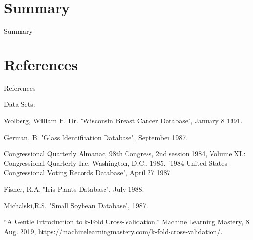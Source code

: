 \documentclass{article}
\begin{document}
\section{Summary}

Summary

\section{References}

References

Data Sets:

Wolberg, William H. Dr. "Wisconsin Breast Cancer Database", January 8 1991.

German, B. "Glass Identification Database", September 1987.

Congressional Quarterly Almanac, 98th Congress, 2nd session 1984, Volume XL: Congressional Quarterly Inc. Washington, D.C., 1985. "1984 United States Congressional Voting Records Database", April 27 1987.

Fisher, R.A. "Iris Plants Database", July 1988.

Michalski,R.S. "Small Soybean Database", 1987.

“A Gentle Introduction to k-Fold Cross-Validation.” Machine Learning Mastery, 8 Aug. 2019, https://machinelearningmastery.com/k-fold-cross-validation/.
\end{document}
